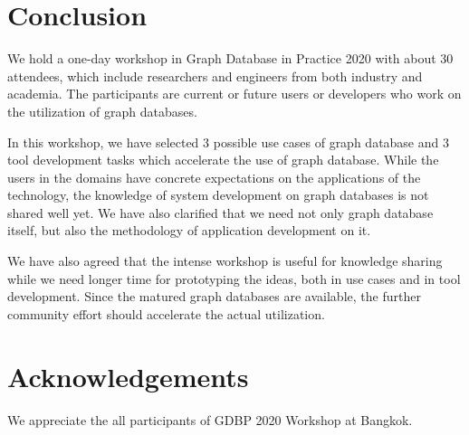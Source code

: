 \documentclass[runningheads]{llncs}
\begin{document}






\section{Conclusion}
We hold a one-day workshop in Graph Database in Practice 2020 with about 30 attendees, which include researchers and engineers from both industry and academia. The participants are current or future users or developers who work on the utilization of graph databases.

In this workshop, we have selected 3 possible use cases of graph database and 3 tool development tasks which accelerate the use of graph database. While the users in the domains have concrete expectations on the applications of the technology, the knowledge of system development on graph databases is not shared well yet. We have also clarified that we need not only graph database itself, but also the methodology of application development on it.

We have also agreed that the intense workshop is useful for knowledge sharing while we need longer time for prototyping the ideas, both in use cases and in tool development. Since the matured graph databases are available, the further community effort should accelerate the actual utilization.



\section*{Acknowledgements}
We appreciate the all participants of GDBP 2020 Workshop at Bangkok.
\end{document}
